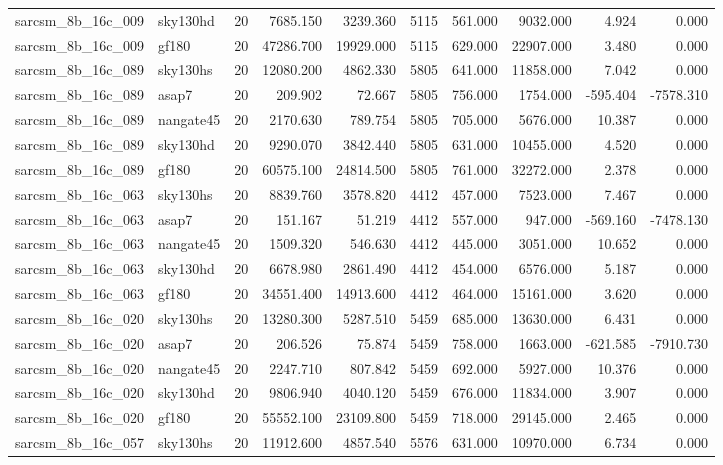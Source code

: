 \begin{longtable}{llrrrrrrrr}
sarcsm\_8b\_16c\_009 & sky130hd & 20 & 7685.150 & 3239.360 & 5115 & 561.000 & 9032.000 & 4.924 & 0.000 \\
sarcsm\_8b\_16c\_009 & gf180 & 20 & 47286.700 & 19929.000 & 5115 & 629.000 & 22907.000 & 3.480 & 0.000 \\
sarcsm\_8b\_16c\_089 & sky130hs & 20 & 12080.200 & 4862.330 & 5805 & 641.000 & 11858.000 & 7.042 & 0.000 \\
sarcsm\_8b\_16c\_089 & asap7 & 20 & 209.902 & 72.667 & 5805 & 756.000 & 1754.000 & -595.404 & -7578.310 \\
sarcsm\_8b\_16c\_089 & nangate45 & 20 & 2170.630 & 789.754 & 5805 & 705.000 & 5676.000 & 10.387 & 0.000 \\
sarcsm\_8b\_16c\_089 & sky130hd & 20 & 9290.070 & 3842.440 & 5805 & 631.000 & 10455.000 & 4.520 & 0.000 \\
sarcsm\_8b\_16c\_089 & gf180 & 20 & 60575.100 & 24814.500 & 5805 & 761.000 & 32272.000 & 2.378 & 0.000 \\
sarcsm\_8b\_16c\_063 & sky130hs & 20 & 8839.760 & 3578.820 & 4412 & 457.000 & 7523.000 & 7.467 & 0.000 \\
sarcsm\_8b\_16c\_063 & asap7 & 20 & 151.167 & 51.219 & 4412 & 557.000 & 947.000 & -569.160 & -7478.130 \\
sarcsm\_8b\_16c\_063 & nangate45 & 20 & 1509.320 & 546.630 & 4412 & 445.000 & 3051.000 & 10.652 & 0.000 \\
sarcsm\_8b\_16c\_063 & sky130hd & 20 & 6678.980 & 2861.490 & 4412 & 454.000 & 6576.000 & 5.187 & 0.000 \\
sarcsm\_8b\_16c\_063 & gf180 & 20 & 34551.400 & 14913.600 & 4412 & 464.000 & 15161.000 & 3.620 & 0.000 \\
sarcsm\_8b\_16c\_020 & sky130hs & 20 & 13280.300 & 5287.510 & 5459 & 685.000 & 13630.000 & 6.431 & 0.000 \\
sarcsm\_8b\_16c\_020 & asap7 & 20 & 206.526 & 75.874 & 5459 & 758.000 & 1663.000 & -621.585 & -7910.730 \\
sarcsm\_8b\_16c\_020 & nangate45 & 20 & 2247.710 & 807.842 & 5459 & 692.000 & 5927.000 & 10.376 & 0.000 \\
sarcsm\_8b\_16c\_020 & sky130hd & 20 & 9806.940 & 4040.120 & 5459 & 676.000 & 11834.000 & 3.907 & 0.000 \\
sarcsm\_8b\_16c\_020 & gf180 & 20 & 55552.100 & 23109.800 & 5459 & 718.000 & 29145.000 & 2.465 & 0.000 \\
sarcsm\_8b\_16c\_057 & sky130hs & 20 & 11912.600 & 4857.540 & 5576 & 631.000 & 10970.000 & 6.734 & 0.000 \\

\end{longtable}
